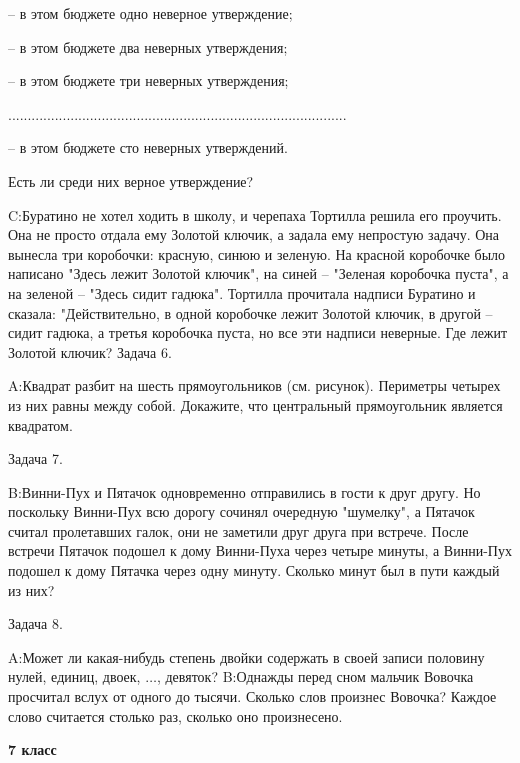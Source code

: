 \documentclass[11pt,a4paper,book]{ncc} \usepackage{modules/nonstahp_book}
\begin{document}
-- в этом бюджете одно неверное утверждение;

-- в этом бюджете два неверных утверждения;

-- в этом бюджете три неверных утверждения;

.......................................................................................

-- в этом бюджете сто неверных утверждений.

Есть ли среди них верное утверждение?
\medbreak\noindent

\medbreak\noindent
C:\qquad Буратино не хотел ходить в школу, и черепаха Тортилла решила его проучить. Она не просто отдала ему Золотой ключик, а задала ему непростую задачу. Она вынесла три коробочки: красную, синюю и зеленую. На красной коробочке было написано "Здесь лежит Золотой ключик", на синей -- "Зеленая коробочка пуста", а на зеленой -- "Здесь сидит гадюка". Тортилла прочитала надписи Буратино и сказала: "Действительно, в одной коробочке лежит Золотой ключик, в другой -- сидит гадюка, а третья коробочка пуста, но все эти надписи неверные. Где лежит Золотой ключик?\bigbreak\noindent
Задача 6.\par\noindent
A:\qquad Квадрат разбит на шесть прямоугольников (см. рисунок). Периметры четырех из них равны между собой. Докажите, что центральный прямоугольник является квадратом.\medbreak\noindent

\bigbreak\noindent
Задача 7.\par\noindent

\medbreak\noindent
B:\qquad Винни-Пух и Пятачок одновременно отправились в гости к друг другу. Но поскольку Винни-Пух всю дорогу сочинял очередную "шумелку", а Пятачок считал пролетавших галок, они не заметили друг друга при встрече. После встречи Пятачок подошел к дому Винни-Пуха через четыре минуты, а Винни-Пух подошел к дому Пятачка через одну минуту. Сколько минут был в пути каждый из них?
\medbreak\noindent

\bigbreak\noindent
Задача 8.\par\noindent
A:\qquad Может ли какая-нибудь степень двойки содержать в своей записи половину нулей, единиц, двоек, $\ldots$, девяток?\medbreak\noindent
B:\qquad Однажды перед сном мальчик Вовочка просчитал вслух от одного до тысячи. Сколько слов произнес Вовочка? Каждое слово считается столько раз, сколько оно произнесено.\medbreak\noindent


\vfill\eject

\medbreak\centerline{\bf 7 класс}\bigbreak\noindent
\end{document}
